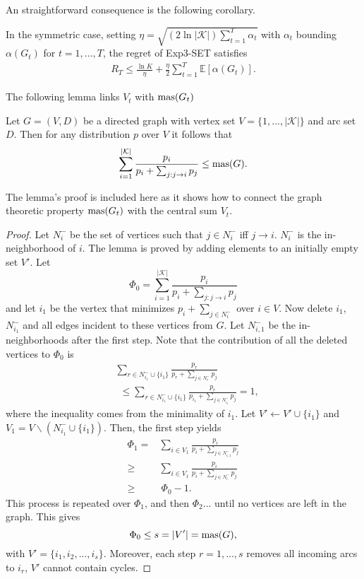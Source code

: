 An straightforward consequence is the following corollary.

\begin{corollary} \label{alon:corollary}
	In the symmetric case, setting $\eta=\sqrt{(2\ln |\mathcal{K}|)\sum_{t=1}^T\alpha_t}$ with $\alpha_t$ bounding $\alpha(G_t)$ for $t=1,...,T$, the regret of Exp3-SET satisfies 
	\begin{align}
		R_T\leq \frac{\ln K}{\eta} +\frac{\eta}{2}\sum_{t=1}^T\mathbb{E}[\alpha(G_t)].
	\end{align}
\end{corollary}

The following lemma links $V_t$ with $\text{\normalfont mas}(G_t)$

\begin{lemma}
	Let $G=(V,D)$ be a directed graph with vertex set $V=\{1,...,|\mathcal{K}|\}$ and arc set $D$. Then for any distribution $p$ over $V$ it follows that
	\begin{align}
		\sum_{i=1}^{|\mathcal{K}|}\frac{p_i}{p_i+\sum_{j:j\to i}p_j}\leq \text{\normalfont mas}(G).
	\end{align}
\end{lemma}

The lemma's proof is included here as it shows how to connect the graph theoretic property $\text{\normalfont mas}(G_t)$ with the central sum $V_t$. 
\begin{proof}
	Let $N_i^-$ be the set of vertices such that $j\in N_i^-$ iff $j\to i$. $N_i^-$ is the in-neighborhood of $i$. The lemma is proved by adding elements to an initially empty set $V'$. Let 
	$$\Phi_0=\sum_{i=1}^{|\mathcal{K}|}\frac{p_i}{p_i+\sum_{j:j\to i}p_j}$$
	and let $i_1$ be the vertex that minimizes $p_i+\sum_{j\in N_i^-}$ over $i\in V$. Now delete $i_1$, $N_{i_1}^-$ and all edges incident to these vertices from $G$. Let $N_{i,1}^-$ be the in-neighborhoods after the first step. Note that the contribution of all the deleted vertices to $\Phi_0$ is 
	\begin{align*}
		&\sum_{r\in N_{i_1}^-\cup\{i_1\}}\frac{p_r}{p_r+\sum_{j\in N_r^-}p_j}\\
		&\:\:\leq \sum_{r\in N_{i_1}^-\cup\{i_1\}}\frac{p_r}{p_{i_1}+\sum_{j\in N_{i_1}^-}p_j}=1,
	\end{align*}
	where the inequality comes from the minimality of $i_1$. Let $V'\leftarrow V'\cup \{i_1\}$ and $V_1=V\backslash (N_{i_1}^-\cup\{i_1\})$. Then, the first step yields
	\begin{align*}
		\Phi_1=&\sum_{i\in V_1}\frac{p_i}{p_i+\sum_{j\in N_{i,1}^-}p_j}\\
		\geq & \sum_{i\in V_1}\frac{p_i}{p_i+\sum_{j\in N_i^-}p_j}\\
		\geq &\:\Phi_0-1.
	\end{align*}
	This process is repeated over $\Phi_1$, and then $\Phi_2$... until no vertices are left in the graph. This gives $$\Phi_0\leq s=|V'|=\text{\normalfont mas}(G),$$ with $V'=\{i_1, i_2,...,i_s\}.$ Moreover, each step $r=1,...,s$ removes all incoming arcs to $i_r$, $V'$ cannot contain cycles. 
\end{proof}

